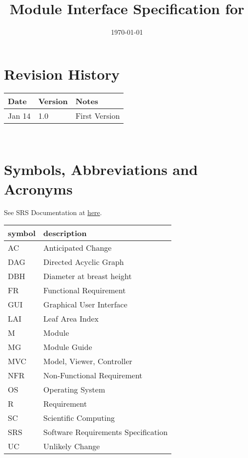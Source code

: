 \documentclass[12pt, titlepage]{article}
\begin{document}
\title{Module Interface Specification for \progname{}}

\author{\authname}

\date{\today}

\maketitle


\section{Revision History}

\begin{tabularx}{\textwidth}{p{3cm}p{2cm}X}
\toprule {\bf Date} & {\bf Version} & {\bf Notes}\\
\midrule
Jan 14 & 1.0 & First Version\\
\bottomrule
\end{tabularx}

~\newpage

\section{Symbols, Abbreviations and Acronyms}

See SRS Documentation at \href{https://github.com/wuj187/DigitalTwinCAS/blob/main/docs/DocRevision/SRSRevision/SRSRevision.pdf}{here}.
\\

\begin{tabular}{l l} 
  \toprule		
  \textbf{symbol} & \textbf{description}\\
  \midrule 
  AC & Anticipated Change\\
  DAG & Directed Acyclic Graph \\
  DBH & Diameter at breast height\\
  FR & Functional Requirement\\
  GUI & Graphical User Interface\\
  LAI & Leaf Area Index\\
  M & Module \\
  MG & Module Guide \\
  MVC & Model, Viewer, Controller\\
  NFR & Non-Functional Requirement\\
  OS & Operating System \\
  R & Requirement\\
  SC & Scientific Computing \\
  SRS & Software Requirements Specification\\
  UC & Unlikely Change \\
  \bottomrule
\end{tabular}\\
\newpage
\end{document}

